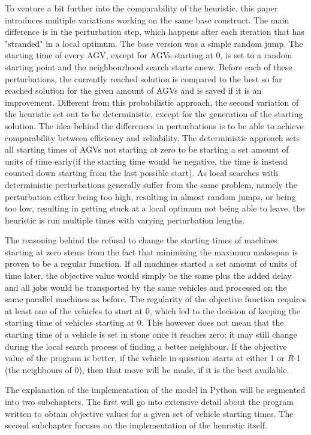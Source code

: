 To venture a bit further into the comparability of the heuristic, this paper introduces multiple variations working on the same base construct.
The main difference is in the perturbation step, which happens after each iteration that has "stranded" in a local optimum. The base version was
a simple random jump. The starting time of every AGV, except for AGVs starting at 0, is set to a random starting point and the neighbourhood
search starts anew. Before each of these perturbations, the currently reached solution is compared to the best so far reached solution for the given
amount of AGVs and is saved if it is an improvement. Different from this probabilistic approach, the second variation of the heuristic set out to
be deterministic, except for the generation of the starting solution. The idea behind the differences in perturbations is to be able to achieve
comparability between efficiency and reliability. The deterministic approach sets all starting times of AGVs not starting at zero to be starting
a set amount of units of time early(if the starting time would be negative, the time is instead counted down starting from the last possible start).
As local searches with deterministic perturbations generally suffer from the same problem, namely the perturbation either being too high, resulting
in almost random jumps, or being too low, resulting in getting stuck at a local optimum not being able to leave, the heuristic is run multiple
times with varying perturbation lengths.

The reasoning behind the refusal to change the starting times of machines starting at zero stems from the fact that minimizing the maximum makespan
is proven to be a regular function. If all machines started a set amount of units of time later, the objective value would simply
be the same plus the added delay and all jobs would be transported by the same vehicles and processed on the same parallel machines as before. The
regularity of the objective function requires at least one of the vehicles to start at 0, which led to the decision of keeping the starting
time of vehicles starting at 0. This however does not mean that the starting time of a vehicle is set in stone once it reaches zero; it may
still change during the local search process of finding a better neighbour. If the objective value of the program is better, if the vehicle in question
starts at either 1 or \(R\)-1 (the neighbours of 0), then that move will be made, if it is the best available.

The explanation of the implementation of the model in Python will be segmented into two subchapters. The first will go into extensive detail about
the program written to obtain objective values for a given set of vehicle starting times. The second subchapter focuses on the implementation of the
heuristic itself.